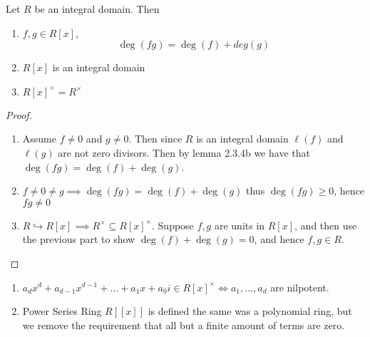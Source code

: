 \documentclass[master.tex]{subfiles}
\newcommand{\polyex}[2]{{#1}_#2 x^{#2} + {#1}_{#2-1}x^{#2-1} + \ldots + {#1}_1 x + {#1}_0}
\begin{document}
\begin{prop}
  Let \(R\) be an integral domain. Then
  \begin{enumerate}[label=(\alph*)]
  \item \(f,g \in R[x]\), \[\deg(fg)=\deg(f)+deg(g)\]
  \item \(R[x]\) is an integral domain
  \item \(R[x]^\times = R^\times\)
  \end{enumerate}
\end{prop}

\begin{proof}
  \begin{enumerate}[label=(\alph*)]
  \item Assume \(f \neq 0\) and \(g \neq 0\). Then since \(R\) is an integral domain \(\ell(f)\) and \(\ell(g)\) are not
    zero divisors. Then by lemma 2.3.4b we have that \(\deg(fg)=\deg(f)+\deg(g)\).
  \item \(f \neq 0 \neq g \implies \deg(fg)=\deg(f)+\deg(g)\) thus \(\deg(fg) \ge 0\), hence \(fg \neq 0\)
  \item \(R \hookrightarrow R[x] \implies R^\times \subseteq R[x]^\times\). Suppose \(f,g\) are units in \(R[x]\), and
    then use the previous part to show
    \(\deg(f)+\deg(g)=0\), and hence \(f,g \in R\). 
  \end{enumerate}
\end{proof}

\begin{rmk}
\begin{enumerate}
\item \(\polyex{a}{d}{i} \in R[x]^\times \iff a_1, \ldots, a_d\) are nilpotent.
\item Power Series Ring \(R[[x]]\) is defined the same was a polynomial ring, but we remove the requirement that all but
  a finite amount of terms are zero.
\end{enumerate}
\end{rmk}
\end{document}
